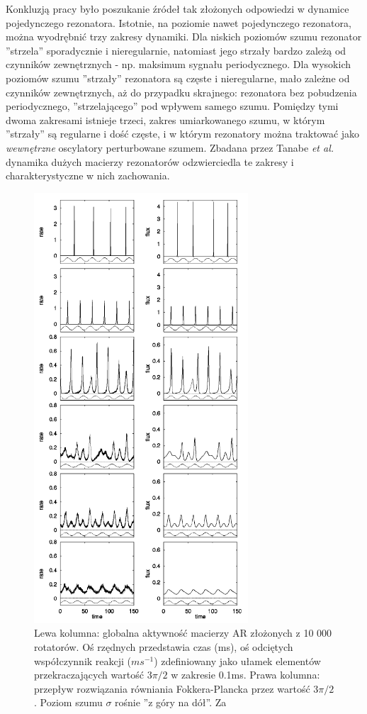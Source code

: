   Konkluzją pracy było poszukanie źródeł tak złożonych odpowiedzi w dynamice pojedynczego rezonatora. Istotnie, na poziomie nawet pojedynczego rezonatora, można wyodrębnić trzy zakresy dynamiki. Dla niskich poziomów szumu rezonator ''strzela'' sporadycznie i nieregularnie, natomiast jego strzały bardzo zależą od czynników zewnętrznych - np. maksimum sygnału periodycznego. Dla wysokich poziomów szumu ''strzały'' rezonatora są częste i nieregularne, mało zależne od czynników zewnętrznych, aż do przypadku skrajnego: rezonatora bez pobudzenia periodycznego, ''strzelającego'' pod wpływem samego szumu. Pomiędzy tymi dwoma zakresami istnieje trzeci, zakres umiarkowanego szumu, w którym ''strzały'' są regularne i dość częste, i w którym rezonatory można traktować jako \emph{wewnętrzne} oscylatory perturbowane szumem. Zbadana przez Tanabe \emph{et al.} dynamika dużych macierzy rezonatorów odzwierciedla te zakresy i charakterystyczne w nich zachowania.

  \begin{figure}
    \includegraphics[width=80mm]{images/tanabe.png}
    \caption{Lewa kolumna: globalna aktywność macierzy AR złożonych z 10 000 rotatorów. Oś rzędnych przedstawia czas (ms), oś odciętych współczynnik reakcji ($ms^{-1}$) zdefiniowany jako ułamek elementów przekraczających wartość $3 \pi / 2$ w zakresie 0.1ms. Prawa kolumna: przepływ rozwiązania równiania Fokkera-Plancka przez wartość $3 \pi / 2$. Poziom szumu $\sigma$ rośnie ''z góry na dół''. Za \cite{tanabe_shimokawa}}
    \label{fig:graphics:tanabe}
  \end{figure}

